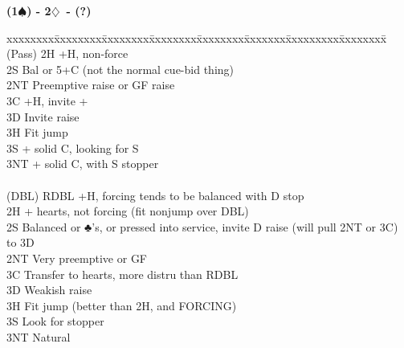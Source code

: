 \documentclass[10pt]{article}
\renewcommand{\d}{$\diamondsuit$}
\newcommand{\s}{$\spadesuit$}
\newcommand{\x}{DBL}
\newenvironment{bidtable}[1][]
{\textbf{#1}
  \begin{adjustwidth}{1em}{}
    \addvspace{2pt}
    \begin{tabbing}
      xxxxxxxx\=xxxxxxxx\=xxxxxxxx\=xxxxxxxx\=xxxxxxxx\=xxxxxxx\=xxxxxxxxx\=xxxxxxxx\=\kill}
{\end{tabbing}\end{adjustwidth}\bigskip}%
\begin{document}
\begin{bidtable}[(1\s) - 2\d\ - (?)]
(Pass) \> 2H   +H, non-force                                                                       \\
       \> 2S   \> Bal or 5+C (not the normal cue-bid thing)                                            \\
       \> 2NT  \> Preemptive raise or GF raise                                                         \\
       \> 3C   +H, invite +                                                                        \\
       \> 3D   \> Invite raise                                                                         \\
       \> 3H   \> Fit jump                                                                             \\
       \> 3S   + solid C, looking for S                                                            \\
       \> 3NT  + solid C, with S stopper                                                           \\
                                                                                                       \\
(\x)   \> RDBL +H, forcing tends to be balanced with D stop                                        \\
       \> 2H   + hearts, not forcing (fit nonjump over DBL)                                        \\
       \> 2S   \> Balanced or ♣’s, or pressed into service, invite D raise (will pull 2NT or 3C) to 3D \\
       \> 2NT  \> Very preemptive or GF                                                                \\
       \> 3C   \> Transfer to hearts, more distru than RDBL                                            \\
       \> 3D   \> Weakish raise                                                                        \\
       \> 3H   \> Fit jump (better than 2H, and FORCING)                                               \\
       \> 3S   \> Look for stopper                                                                     \\
       \> 3NT  \> Natural                                                                              \\

\end{bidtable}
\end{document}
